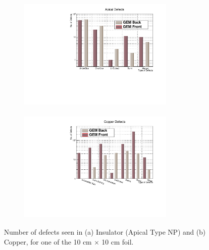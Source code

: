 \begin{figure}[!htbp]
    \centering
    \begin{subfigure}[b]{0.49\textwidth}
        \includegraphics[width=7.6cm, height=5.5cm]{figures/GEM/figures/Apical_Defects.pdf}\qquad
        \caption{ }
        \label{fig:O_9a}
    \end{subfigure}
    \begin{subfigure}[b]{0.49\textwidth}
        \includegraphics[width=7.6cm, height=5.5cm]{figures/GEM/figures/CopperDefects.pdf}
        \caption{ }
        \label{fig:O_9b}
    \end{subfigure}
   \caption{Number of defects seen in (a) Insulator (Apical Type NP) and (b) Copper, for one of the 10 cm $\times$ 10 cm foil.} \label{fig:Optical_04}
\end{figure}


